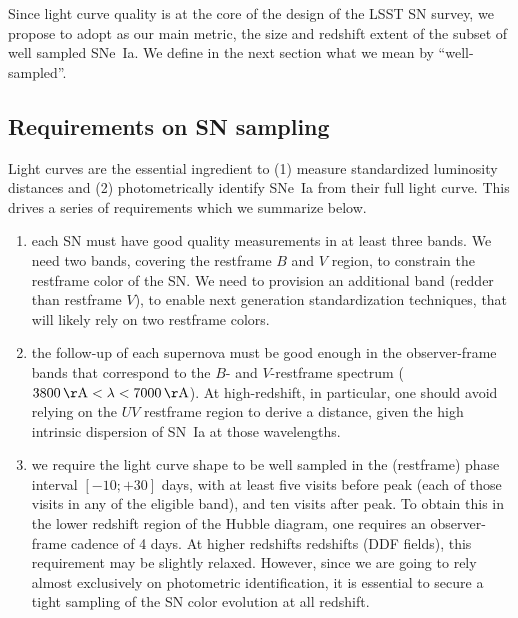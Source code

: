 \documentclass [11pt,a4paper]{article}
\begin{document}
Since light curve quality is at the core of the design of the LSST SN
survey, we propose to adopt as our main metric, the size and redshift
extent of the subset of well sampled SNe~Ia.  We define in the next
section what we mean by ``well-sampled''.


\subsection{Requirements on SN sampling}

Light curves are the essential ingredient to (1) measure standardized
luminosity distances and (2) photometrically identify SNe~Ia from
their full light curve. This drives a series of requirements which we
summarize below.

\begin{enumerate}

\item each SN must have good quality measurements in at least three
  bands. We need two bands, covering the restframe $B$ and $V$ region,
  to constrain the restframe color of the SN. We need to provision an
  additional band (redder than restframe $V$), to enable next
  generation standardization techniques, that will likely rely on two
  restframe colors.

\item the follow-up of each supernova must be good enough in the
  observer-frame bands that correspond to the $B$- and $V$-restframe
  spectrum ($3800 \angstrom < \lambda < 7000 \angstrom$).  At
  high-redshift, in particular, one should avoid relying on the $UV$
  restframe region to derive a distance, given the high intrinsic
  dispersion of SN~Ia at those wavelengths.
  
\item we require the light curve shape to be well sampled in the
  (restframe) phase interval $[-10;+30]$ days, with at least five
  visits before peak (each of those visits in any of the eligible
  band), and ten visits after peak.  To obtain this in the lower
  redshift region of the Hubble diagram, one requires an
  observer-frame cadence of 4 days.  At higher redshifts redshifts
  (DDF fields), this requirement may be slightly relaxed. However,
  since we are going to rely almost exclusively on photometric
  identification, it is essential to secure a tight sampling of the SN
  color evolution at all redshift.
  

\end{enumerate}
\end{document}
